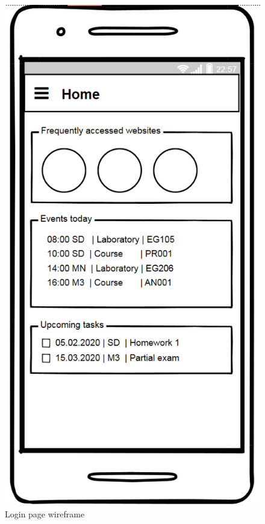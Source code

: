 \begin{figure}[!ht]
\begin{minipage}[b]{0.25\textwidth}
        \caption{Login page wireframe}
        \label{4:fig:balsamiq_login}
    \end{minipage}
    \hfill
    \begin{minipage}[b]{0.26\textwidth}
        \captionsetup{justification=centering}
        \includegraphics[width=\textwidth]{figures/app/balsamiq/home.png}

\end{minipage}
\end{figure}

